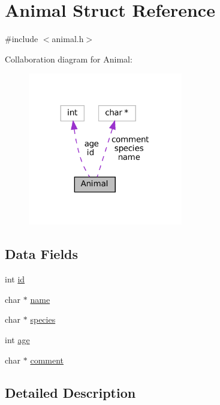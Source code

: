 \hypertarget{struct_animal}{}\section{Animal Struct Reference}
\label{struct_animal}


{\ttfamily \#include $<$animal.\+h$>$}



Collaboration diagram for Animal\+:
\nopagebreak
\begin{figure}[H]
\begin{center}
\leavevmode
\includegraphics[width=191pt]{struct_animal__coll__graph}
\end{center}
\end{figure}
\subsection*{Data Fields}
\begin{DoxyCompactItemize}
\item 
int \mbox{\hyperlink{struct_animal_a0e1e797aa638af5d8276bcf12fad9a1f}{id}}
\item 
char $\ast$ \mbox{\hyperlink{struct_animal_a0b50566cb6e016fad6b40b4feaf67b1e}{name}}
\item 
char $\ast$ \mbox{\hyperlink{struct_animal_a64f20dd8929ab24362896fc4bdd5bc6d}{species}}
\item 
int \mbox{\hyperlink{struct_animal_a31e4a23bef9596927496de4eb6b9c721}{age}}
\item 
char $\ast$ \mbox{\hyperlink{struct_animal_a6e65a2d3d4dff6a58459fc211e5470c4}{comment}}
\end{DoxyCompactItemize}


\subsection{Detailed Description}


